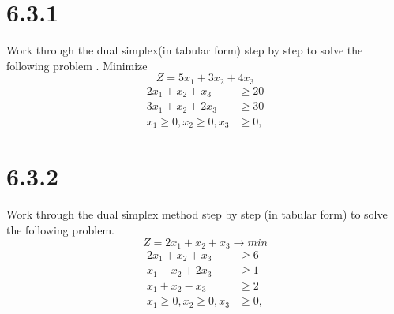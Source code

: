 \documentclass{article}
\begin{document}
\section*{6.3.1}
Work through the dual simplex(in tabular form) step by step to solve the following problem .
Minimize
\begin{equation*}
    Z = 5x_{1} + 3x_{2} + 4x_{3}
\end{equation*}
\begin{align*}
    2x_{1} + x_{2} + x_{3} &\geq 20\\
    3x_{1} + x_{2} + 2x_{3} &\geq 30\\
    x_{1} \geq 0, x_{2} \geq 0, x_{3} &\geq 0,
\end{align*}

\section*{6.3.2}
Work through the dual simplex method step by step (in tabular form) to solve the following problem.
\begin{equation*}
    Z = 2x_{1} + x_{2} + x_{3} \rightarrow min
\end{equation*}
\begin{align*}
    2x_{1} + x_{2} + x_{3} &\geq 6\\
    x_{1} - x_{2} + 2x_{3} &\geq 1\\
    x_{1} + x_{2} - x_{3} &\geq 2\\
    x_{1} \geq 0, x_{2} \geq 0, x_{3} &\geq 0,
\end{align*}
\end{document}
